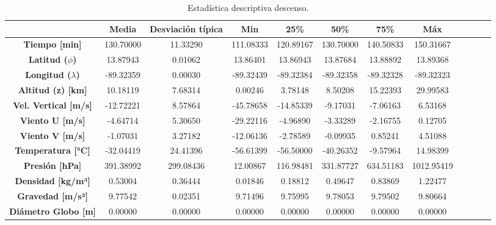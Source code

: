 \begin{table}
\small
\centering
\caption{Estadística descriptiva descenso.}
\label{tab:desciptivo_descenso}
\begin{tabular}{cccccccccccc}
\toprule
{} &  \textbf{Media} &  \textbf{Desviación típica} &  \textbf{Min} &  \textbf{25\%} &  \textbf{50\%} &  \textbf{75\%} &  \textbf{Máx} \\
\midrule
\textbf{\textbf{Tiempo [min]}        } &       130.70000 &                    11.33290 &     111.08333 &      120.89167 &      130.70000 &      140.50833 &     150.31667 \\
\textbf{\textbf{Latitud ($\phi$)}    } &        13.87943 &                     0.01062 &      13.86401 &       13.86943 &       13.87684 &       13.88892 &      13.89368 \\
\textbf{\textbf{Longitud ($\lambda$)}} &       -89.32359 &                     0.00030 &     -89.32439 &      -89.32384 &      -89.32358 &      -89.32328 &     -89.32323 \\
\textbf{\textbf{Altitud (z) [km]}    } &        10.18119 &                     7.68314 &       0.00246 &        3.78148 &        8.50208 &       15.22393 &      29.99583 \\
\textbf{\textbf{Vel. Vertical [m/s]} } &       -12.72221 &                     8.57864 &     -45.78658 &      -14.85339 &       -9.17031 &       -7.06163 &       6.53168 \\
\textbf{\textbf{Viento U [m/s]}      } &        -4.64714 &                     5.30650 &     -29.22116 &       -4.96890 &       -3.33289 &       -2.16755 &       0.12705 \\
\textbf{\textbf{Viento V [m/s]}      } &        -1.07031 &                     3.27182 &     -12.06136 &       -2.78589 &       -0.09935 &        0.85241 &       4.51088 \\
\textbf{\textbf{Temperatura [°C]}    } &       -32.04419 &                    24.41396 &     -56.61399 &      -56.50000 &      -40.26352 &       -9.57964 &      14.98399 \\
\textbf{\textbf{Presión [hPa]}       } &       391.38992 &                   299.08436 &      12.00867 &      116.98481 &      331.87727 &      634.51183 &    1012.95419 \\
\textbf{\textbf{Densidad [kg/m³]}    } &         0.53004 &                     0.36444 &       0.01846 &        0.18812 &        0.49647 &        0.83869 &       1.22477 \\
\textbf{\textbf{Gravedad [m/s²]}     } &         9.77542 &                     0.02351 &       9.71496 &        9.75995 &        9.78053 &        9.79502 &       9.80664 \\
\textbf{\textbf{Diámetro Globo [m]}  } &         0.00000 &                     0.00000 &       0.00000 &        0.00000 &        0.00000 &        0.00000 &       0.00000 \\
\bottomrule
\end{tabular}
\end{table}
